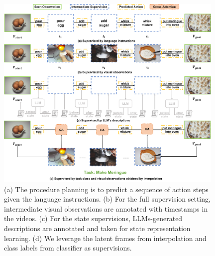 \begin{figure}
\includegraphics[width=0.98\textwidth, height=0.49\textheight]{figures/fig-task.png}
\vspace{-0.5em}
\caption{(a) The procedure planning is to predict a sequence of action steps given the language instructions. (b) For the full supervision setting, intermediate visual observations are annotated with timestamps in the videos. (c) For the state supervisions, LLMs-generated descriptions are annotated and taken for state representation learning. (d) We leverage the latent frames from interpolation and class labels from classifier as supervisions.}
\label{fig:task}
\vspace{-4mm}
\end{figure}




